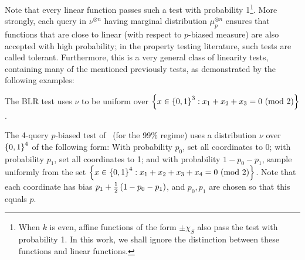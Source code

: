 Note that every linear function passes such a test with probability 1\footnote{When $k$ is even, affine functions of the form $\pm \chi_S$ also pass the test with probability 1. In this work, we shall ignore the distinction between these functions and linear functions.}.
More strongly, each query in $\nu^{\otimes n}$ having marginal distribution $\mu_p^{\otimes n}$ ensures that functions that are close to linear (with respect to $p$-biased measure) are also accepted with high probability; in the property testing literature, such tests are called tolerant.
Furthermore, this is a very general class of linearity tests, containing many of the mentioned previously tests, as demonstrated by the following examples:

\begin{example}
	The BLR test uses $\nu$ to be uniform over ${\left\{ x\in \left\{ 0,1 \right\}^3 : x_1+x_2+x_3 = 0 \textnormal{ (mod 2)} \right\}}$.
\end{example}
\begin{example}\label{eg:dfh19_test}
	The 4-query $p$-biased test of~\cite{DFH19} (for the 99\% regime) uses a distribution $\nu$ over $\left\{ 0,1 \right\}^4$ of the following form:
	With probability $p_0$, set all coordinates to 0; with probability $p_1$, set all coordinates to 1; and with probability $1-p_0-p_1$, sample uniformly from the set $\left\{ x\in \left\{ 0,1 \right\}^4 : x_1+x_2+x_3+x_4 = 0 \textnormal{ (mod 2)} \right\}$.
	Note that each coordinate has bias $p_1 + \frac{1}{2}\left( 1-p_0-p_1 \right)$, and $p_0,p_1$ are chosen so that this equals $p$.
\end{example}

